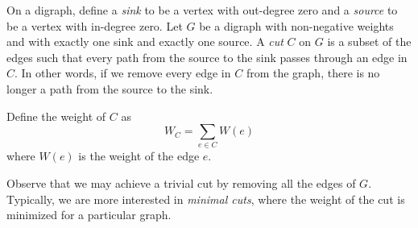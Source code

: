 \documentclass[12pt]{article}
\begin{document}
On a digraph, define a \emph{sink} to be a vertex with out-degree zero and a \emph{source} to be a vertex with in-degree zero.  Let $G$ be a digraph with non-negative weights and with exactly one sink and exactly one source.  A \emph{cut} $C$ on $G$ is a subset of the edges such that every path from the source to the sink passes through an edge in $C$.  In other words, if we remove every edge in $C$ from the graph, there is no longer a path from the source to the sink.

Define the weight of $C$ as
$$W_C = \sum_{e \in C} W(e)$$
where $W(e)$ is the weight of the edge $e$.

Observe that we may achieve a trivial cut by removing all the edges of $G$.  Typically, we are more interested in \emph{minimal cuts}, where the weight of the cut is minimized for a particular graph.
\end{document}

